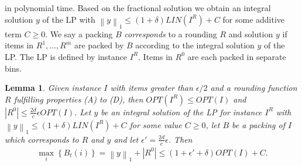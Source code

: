 \documentclass[a4paper,11pt]{article}
\newcommand{\menge}[1]{\left\{#1\right\}}
\newcommand{\nor}[1]{\left\|#1\right\|}
\newtheorem{lem}[thm]{Lemma}
\begin{document}
in polynomial time.
Based on the fractional solution we obtain an integral solution $y$ of the LP with $\nor{y}_1 \leq (1+\delta)\mathit{LIN}(I^R) + C$
for some additive term $C \geq 0$.
We say a packing $B$ \emph{corresponds} to a rounding $R$ and solution $y$ if items 
in $R^1, \ldots ,R^m$ are packed by $B$ according to the integral solution $y$ of the LP. The LP is defined by
instance $I^R$. Items in $R^0$ are each packed in separate bins.
\begin{lem}\label{lem10}
  Given instance $I$ with items greater than $\epsilon/2$ and a rounding function $R$ fulfilling properties
  (A) to (D), then $\mathit{OPT}(I^R) \leq \mathit{OPT}(I)$ and $|R^0| \leq \frac{2d}{c} \epsilon \mathit{OPT}(I)$.
  Let $y$ be an integral solution of the LP for instance $I^R$ with $\nor{y}_1 \leq (1+ \delta)\mathit{LIN(I^R)} +C$ 
  for some value $C \geq 0$, let $B$ be a packing of $I$ which corresponds to $R$ and $y$ and let  
  $\epsilon' =\frac{2d}{c} \epsilon$. Then
  \begin{align*}
    \max_{i}\menge{B_{t}(i)} = \nor{y}_1 + |R^0| \leq (1+\epsilon'+\delta)\mathit{OPT}(I)+C.
  \end{align*}
\end{lem}
\end{document}
